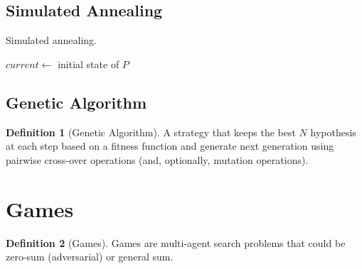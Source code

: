 \documentclass[11pt]{article}
\theoremstyle{definition}
\newtheorem{definition}{Definition}[section]
\theoremstyle{remark}
\begin{document}
\subsection{Simulated Annealing}
\begin{algorithm}[ht]
    \caption{Simulated annealing.}
    
    \DontPrintSemicolon
    
    
    $current \gets$ initial state of $P$ \\
\end{algorithm}

\subsection{Genetic Algorithm}
\begin{definition}[Genetic Algorithm]
A strategy that keeps the best $N$ hypothesis at each step based on a fitness function and generate next generation using pairwise cross-over operations (and, optionally, mutation operations).
\end{definition}
\clearpage

\section{Games}
\begin{definition}[Games]
Games are multi-agent search problems that could be zero-sum (adversarial) or general sum.
\end{definition}
\end{document}
